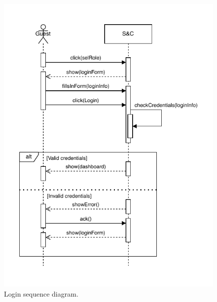 \begin{figure}[H]
    \begin{center}
        \includegraphics[width=\linewidth]{Images/SequenceDiagram/LoginSD2.pdf}
        \caption{Login sequence diagram.}
        \label{fig:login_seqdiag}%
    \end{center}
\end{figure}


